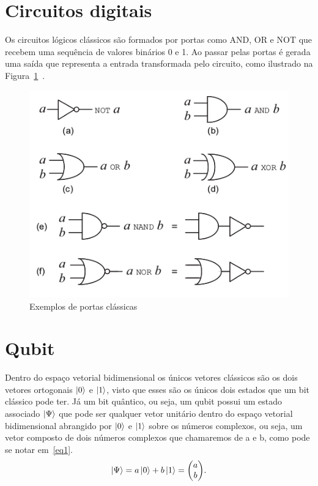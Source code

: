 \documentclass[a4paper, 12pt, oneside]{book}
\begin{document}
\section{Circuitos digitais}
Os circuitos lógicos clássicos são formados por portas como AND, OR e NOT que recebem uma sequência de valores binários 0 e 1. Ao passar pelas portas é gerada uma saída que representa a entrada transformada pelo circuito, como ilustrado na Figura~\ref{fig:classiccircuit}~\cite{nielsen}.

\begin{figure}[H]
\centering
\includegraphics[scale=0.5]{classiccircuit.png}
\caption{Exemplos de portas clássicas}
\label{fig:classiccircuit}
\end{figure}

\section{Qubit}
Dentro do espaço vetorial bidimensional os únicos vetores clássicos são os dois vetores ortogonais $\ket{0}$ e $\ket{1}$, visto que esses são os únicos dois estados que um bit clássico pode ter. Já um bit quântico, ou seja, um qubit possui um estado associado $\ket{\Psi}$ que pode ser qualquer vetor unitário dentro do espaço vetorial bidimensional abrangido por $\ket{0}$ e $\ket{1}$ sobre os números complexos, ou seja, um vetor composto de dois números complexos que chamaremos de a e b, como pode se notar em~\eqref{eq1}.
\begin{equation} \label{eq1} 
\ket{\Psi} = a\ket{0} + b\ket{1} = \mqty(a\\b).
\end{equation}
\end{document}
